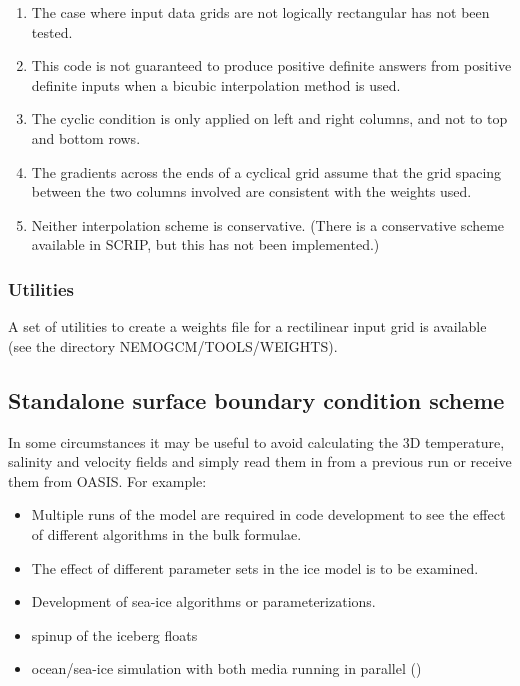 \documentclass[../tex_main/NEMO_manual]{subfiles}
\begin{document}
\begin{enumerate}  
\item  The case where input data grids are not logically rectangular has not been tested.
\item  This code is not guaranteed to produce positive definite answers from positive definite inputs
          when a bicubic interpolation method is used.
\item  The cyclic condition is only applied on left and right columns, and not to top and bottom rows.
\item  The gradients across the ends of a cyclical grid assume that the grid spacing between 
          the two columns involved are consistent with the weights used.
\item  Neither interpolation scheme is conservative. (There is a conservative scheme available 
          in SCRIP, but this has not been implemented.)
\end{enumerate}

\subsubsection{Utilities}
\label{subsec:SBC_iof_util}

A set of utilities to create a weights file for a rectilinear input grid is available 
(see the directory NEMOGCM/TOOLS/WEIGHTS).

\subsection{Standalone surface boundary condition scheme}
\label{subsec:SAS_iof}



In some circumstances it may be useful to avoid calculating the 3D temperature, salinity and velocity fields 
and simply read them in from a previous run or receive them from OASIS.  
For example:

\begin{itemize}
\item  Multiple runs of the model are required in code development to see the effect of different algorithms in
       the bulk formulae.
\item  The effect of different parameter sets in the ice model is to be examined.
\item  Development of sea-ice algorithms or parameterizations.
\item  spinup of the iceberg floats
\item  ocean/sea-ice simulation with both media running in parallel ()
\end{itemize}
\end{document}
